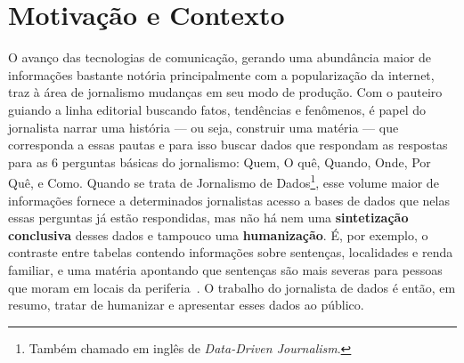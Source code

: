 \section{Motivação e Contexto~\label{sec:Motivação-e-Contexto}}


O avanço das tecnologias de comunicação, gerando uma abundância maior de
informações bastante notória principalmente com a popularização da internet,
traz à área de jornalismo mudanças em seu modo de produção. Com o pauteiro
guiando a linha editorial buscando fatos, tendências e fenômenos, é papel do
jornalista narrar uma história --- ou seja, construir uma matéria ---  que
corresponda a essas pautas e para isso buscar dados que respondam as respostas
para as 6 perguntas básicas do jornalismo: Quem, O quê, Quando, Onde, Por Quê,
e Como. Quando se trata de Jornalismo de Dados\footnote{Também chamado em
inglês de \textit{Data-Driven Journalism}.}, esse volume maior de informações
fornece a determinados jornalistas acesso a bases de dados que nelas essas
perguntas já estão respondidas, mas não há nem uma \textbf{sintetização
conclusiva} desses dados e tampouco uma \textbf{humanização}. É, por exemplo, o
contraste entre tabelas contendo informações sobre sentenças, localidades e
renda familiar, e uma matéria apontando que sentenças são mais severas para
pessoas que moram em locais da
periferia~\cite{news:sentenças-mais-severas-para-periferia}. O trabalho do
jornalista de dados é então, em resumo, tratar de humanizar e apresentar esses
dados ao público.


